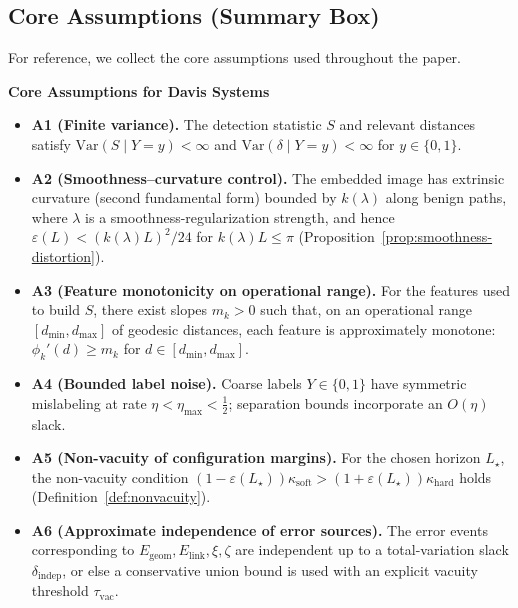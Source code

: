 \documentclass[11pt]{article}
\newcommand{\Var}{\mathrm{Var}}
\theoremstyle{remark}
\theoremstyle{plain}
\begin{document}
\subsection{Core Assumptions (Summary Box)}
\label{subsec:assumptions}

For reference, we collect the core assumptions used throughout the paper.

\begin{mdframed}[linewidth=0.5pt]
\noindent\textbf{Core Assumptions for Davis Systems}
\begin{itemize}[leftmargin=*]
    \item \textbf{A1 (Finite variance).} The detection statistic $S$ and relevant distances
    satisfy $\Var(S \mid Y=y) < \infty$ and $\Var(\delta \mid Y=y) < \infty$ for $y\in\{0,1\}$.

    \item \textbf{A2 (Smoothness--curvature control).} The embedded image has extrinsic
    curvature (second fundamental form) bounded by $k(\lambda)$ along benign paths, where $\lambda$ is a
    smoothness-regularization strength, and hence $\varepsilon(L) < (k(\lambda)L)^2/24$
    for $k(\lambda) L \le \pi$ (Proposition~\ref{prop:smoothness-distortion}).

    \item \textbf{A3 (Feature monotonicity on operational range).} For the features used
    to build $S$, there exist slopes $m_k>0$ such that, on an operational range
    $[d_{\min},d_{\max}]$ of geodesic distances, each feature is approximately monotone:
    $\phi_k'(d) \ge m_k$ for $d\in[d_{\min},d_{\max}]$.

    \item \textbf{A4 (Bounded label noise).} Coarse labels $Y\in\{0,1\}$ have symmetric
    mislabeling at rate $\eta < \eta_{\max} < \tfrac{1}{2}$; separation bounds incorporate
    an $O(\eta)$ slack.

    \item \textbf{A5 (Non-vacuity of configuration margins).} For the chosen horizon
    $L_\star$, the non-vacuity condition
    $(1-\varepsilon(L_\star))\kappa_{\mathrm{soft}} > (1+\varepsilon(L_\star))\kappa_{\mathrm{hard}}$ holds
    (Definition~\ref{def:nonvacuity}).

    \item \textbf{A6 (Approximate independence of error sources).} The error events
    corresponding to $E_{\text{geom}},E_{\text{link}},\xi,\zeta$ are independent up to a
    total-variation slack $\delta_{\text{indep}}$, or else a conservative union bound is
    used with an explicit vacuity threshold $\tau_{\text{vac}}$.
\end{itemize}
\end{mdframed}
\end{document}
